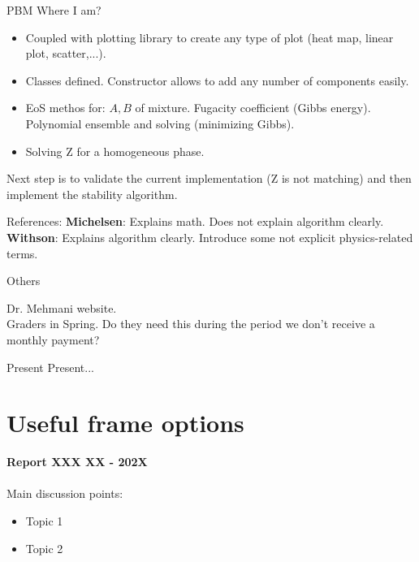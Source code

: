 \documentclass{beamer}
\begin{document}
	\begin{frame}{PBM}
		Where I am?
		\begin{itemize}
			\item Coupled with plotting library to create any type of plot (heat map, linear plot, scatter,...).
			\item Classes defined. Constructor allows to add any number of components easily.
			\item EoS methos for: $A,B$ of mixture. Fugacity coefficient (Gibbs energy). Polynomial ensemble and solving (minimizing Gibbs).
			\item Solving Z for a homogeneous phase.
		\end{itemize}
		Next step is to validate the current implementation (Z is not matching) and then implement the stability algorithm.
		\begin{block}{References:}
			\textbf{Michelsen}: Explains math. Does not explain algorithm clearly.
			\textbf{Withson}: Explains algorithm clearly.  Introduce some not explicit physics-related terms. 
		\end{block}
	\end{frame}

	\begin{frame}{Others}
		
		Dr. Mehmani website.\\
		Graders in Spring. Do they need this during the period we don't receive a monthly payment?\\
	\end{frame}
	
	
	\begin{frame}{Present}
		Present...
	\end{frame}
	
	\section*{Useful frame options}
	\begin{frame}
		\textbf{Report XXX XX - 202X}\\~\\
		Main discussion points:
		\begin{itemize}
			\item Topic 1
			\item Topic 2
		\end{itemize}
	\end{frame}
\end{document}
